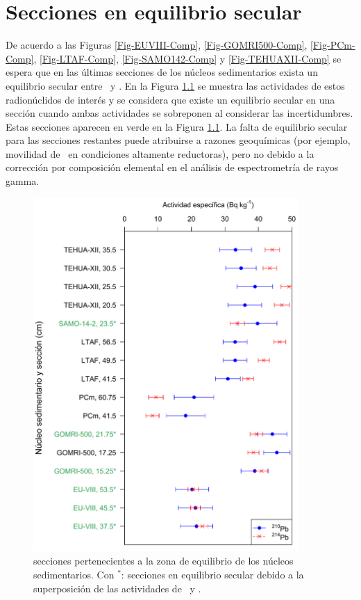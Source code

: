 \chapter{Secciones en equilibrio secular}\label{ApexZonaEquilibrio}
\lettrine{D}{}e acuerdo a las Figuras \ref{Fig-EUVIII-Comp}, \ref{Fig-GOMRI500-Comp}, \ref{Fig-PCm-Comp}, \ref{Fig-LTAF-Comp}, \ref{Fig-SAMO142-Comp} y \ref{Fig-TEHUAXII-Comp} se espera que en las últimas secciones de los núcleos sedimentarios exista un equilibrio secular entre \PbCero\, y \PbCuatro. En la Figura \ref{Fig-SeccEquilibrioSec} se muestra las actividades de estos radionúclidos de interés y se considera que existe un equilibrio secular en una sección cuando ambas actividades se sobreponen al considerar las incertidumbres. Estas secciones aparecen en verde en la Figura \ref{Fig-SeccEquilibrioSec}. La falta de equilibrio secular para las secciones restantes puede atribuirse a razones geoquímicas (por ejemplo, movilidad de \Ra\, en condiciones altamente reductoras), pero no debido a la corrección por composición elemental en el análisis de espectrometría de rayos gamma.
\begin{figure}
\centering
\includegraphics[width=0.9\textwidth]{Imagenes/Analisis_50Oxigeno.png}
\caption{secciones pertenecientes a la zona de equilibrio de los núcleos sedimentarios. Con $^{*}$: secciones en equilibrio secular debido a la superposición de las actividades de \PbCero\, y \PbCuatro.}\label{Fig-SeccEquilibrioSec}
\end{figure}